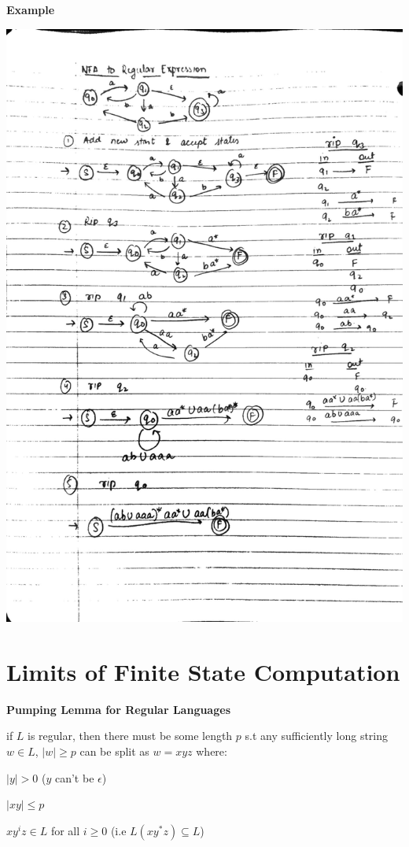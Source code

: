 \documentclass[oneside, 12pt]{book}
\begin{document}
\textbf{Example}

\includegraphics[width=\textwidth]{fatore}


\section{Limits of Finite State Computation}

\textbf{Pumping Lemma for Regular Languages}

if $L$ is regular, then there must be some length $p$ s.t any sufficiently long string $w\in L$, $|w| \ge p$ can be split as $w = xyz$ where:

$|y| > 0$ ($y$ can't be $\epsilon$)

$|xy| \le p$

$xy^{i}z \in L$ for all $i \ge 0$ (i.e $L(xy^{*}z) \subseteq L$)
\end{document}
